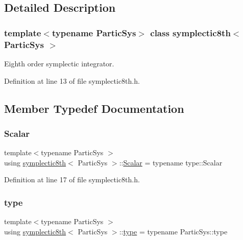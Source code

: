 \subsection{Detailed Description}
\subsubsection*{template$<$typename Partic\+Sys$>$\newline
class symplectic8th$<$ Partic\+Sys $>$}

Eighth order symplectic integrator. 

Definition at line 13 of file symplectic8th.\+h.



\subsection{Member Typedef Documentation}
\mbox{\label{classsymplectic8th_a3a85c2b58a75f2da56a6989a73a001b8}} 
\subsubsection{\texorpdfstring{Scalar}{Scalar}}
{\footnotesize\ttfamily template$<$typename Partic\+Sys $>$ \\
using \mbox{\hyperlink{classsymplectic8th}{symplectic8th}}$<$ Partic\+Sys $>$\+::\mbox{\hyperlink{classsymplectic8th_a3a85c2b58a75f2da56a6989a73a001b8}{Scalar}} =  typename type\+::\+Scalar}



Definition at line 17 of file symplectic8th.\+h.

\mbox{\label{classsymplectic8th_a9e02e91dadeed454d5e3986f83c489fa}} 
\subsubsection{\texorpdfstring{type}{type}}
{\footnotesize\ttfamily template$<$typename Partic\+Sys $>$ \\
using \mbox{\hyperlink{classsymplectic8th}{symplectic8th}}$<$ Partic\+Sys $>$\+::\mbox{\hyperlink{classsymplectic8th_a9e02e91dadeed454d5e3986f83c489fa}{type}} =  typename Partic\+Sys\+::type}



